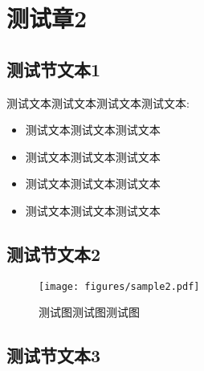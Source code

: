 \chapter{测试章2}

\section{测试节文本1} 

\zhlipsum[3]

测试文本测试文本测试文本测试文本:

\begin{itemize}[label={\checkmark}]
    \item 测试文本测试文本测试文本
    \item 测试文本测试文本测试文本
    \item 测试文本测试文本测试文本
    \item 测试文本测试文本测试文本
\end{itemize}


\section{测试节文本2}

\zhlipsum[4]

\begin{figure}[!htbp]
    \centering
    \texttt{[image: figures/sample2.pdf]}
    \caption{测试图测试图测试图}
    \label{fig:c02:sample2}
\end{figure}


\section{测试节文本3}
